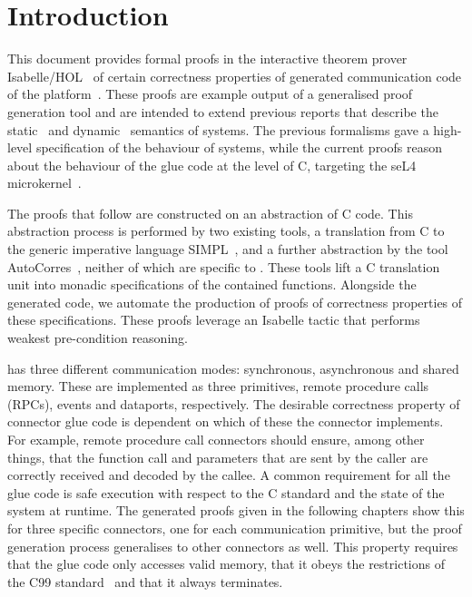 %
%
%

\chapter{Introduction}

This document provides formal proofs in the interactive theorem prover
Isabelle/HOL~\cite{Nipkow_PW:Isabelle} of certain correctness properties of
generated communication code of the \camkes platform~\cite{Kuz_LGH_07}.
These proofs are example output of a generalised proof generation tool and
are intended to extend previous reports that describe the
static~\cite{Fernandez_KKM_13:tr} and dynamic~\cite{Fernandez_GAKK_13:tr}
semantics of \camkes systems.
The previous formalisms gave a high-level specification of the behaviour of
\camkes systems, while the current proofs reason about the behaviour of the
glue code at the level of C, targeting the seL4
microkernel~\cite{Klein_EHACDEEKNSTW_09}.

The proofs that follow are constructed on an abstraction of C code.
This abstraction process is performed by two existing
tools, a translation from C to the generic imperative language
SIMPL~\cite{Winwood_KSACN_09}, and a further abstraction by the tool
AutoCorres~\cite{Greenaway_LAK_14}, neither of which are specific
to \camkes.
These tools lift a C translation unit into monadic specifications of the
contained functions.
Alongside the generated code, we automate the production of proofs of
correctness properties of these specifications.
These proofs leverage an Isabelle
tactic that performs weakest pre-condition reasoning.

\camkes has three different communication modes: synchronous, asynchronous and
shared memory.
These are implemented as three \camkes primitives, remote procedure calls
(RPCs), events and dataports, respectively.
The desirable correctness property of connector glue code is dependent on which
of these the connector implements.
For example, remote procedure call connectors should ensure, among other
things, that the function call and parameters that are sent by the caller are
correctly received and decoded by the callee.
A common requirement for all the glue code is safe execution with respect to
the C standard and the state of the system at runtime.
The generated proofs given in the following chapters show this for three
specific connectors, one for each \camkes communication primitive, but the
proof generation process generalises to other \camkes connectors as well.
This property requires that the glue code only accesses valid memory, that it
obeys the restrictions of the C99 standard~\cite{C99} and that it always
terminates.

